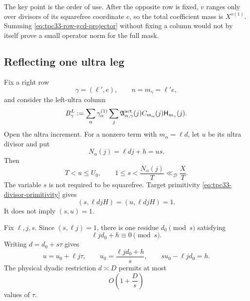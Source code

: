 The key point is the order of use.  After the opposite row is fixed,
\(v\) ranges only over divisors of its squarefree coordinate \(e\), so the
total coefficient mass is \(X^{o(1)}\).  Summing
\eqref{eq:tpc33-row-gcd-projector} without fixing a column would not by
itself prove a small operator norm for the full mask.

\subsection{Reflecting one ultra leg}

Fix a right row
\begin{equation}
 \gamma=(\ell',e),\qquad n=m_\gamma=\ell'e,
 \label{eq:tpc33-fixed-right-column}
\end{equation}
and consider the left-ultra column
\begin{equation}
 B_\gamma^L
 :=\sum_\alpha\gamma_\alpha^{(1)}
 \sum_j\mathfrak A_{\alpha,\gamma}^{\rm act}(j)
 C_{m_\alpha}(j)\mathsf H_{m_\gamma}(j).
 \label{eq:tpc33-left-column-predefinition}
\end{equation}
Open the ultra increment.  For a nonzero term with
\(m_\alpha=\ell d\), let \(u\) be its ultra divisor and put
\begin{equation}
 N_\alpha(j)=\ell dj+h=us.
 \label{eq:tpc33-ultra-reflection}
\end{equation}
Then
\begin{equation}
 T<u\le U_0,\qquad
 1\le s<\frac{N_\alpha(j)}T\ll_{\mathscr D}\frac XT.
 \label{eq:tpc33-reflected-range}
\end{equation}
The variable \(s\) is not required to be squarefree.  Target primitivity
\eqref{eq:tpc33-divisor-primitivity} gives
\begin{equation}
 (s,\ell djH)=(u,\ell djH)=1.
 \label{eq:tpc33-reflected-primitivity}
\end{equation}
It does not imply \((s,u)=1\).

Fix \(\ell,j,s\).  Since \((s,\ell j)=1\), there is one residue
\(d_0\pmod s\) satisfying
\begin{equation}
 \ell jd_0+h\equiv0\pmod s.
 \label{eq:tpc33-d-residue}
\end{equation}
Writing \(d=d_0+s\tau\) gives
\begin{equation}
 u=u_0+\ell j\tau,\qquad
 u_0=\frac{\ell jd_0+h}{s},\qquad
 su_0-\ell jd_0=h.
 \label{eq:tpc33-unprojected-affine-column}
\end{equation}
The physical dyadic restriction \(d\asymp D\) permits at most
\begin{equation}
 O\!\left(1+\frac Ds\right)
 \label{eq:tpc33-unprojected-fiber-length}
\end{equation}
values of \(\tau\).

